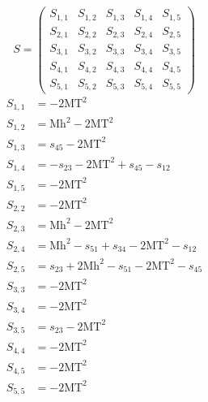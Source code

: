 \documentclass[a4paper]{article}
\begin{document}
\begin{equation}
S=\left(\begin{array}{ccccc}
   S_{1,1}&
   S_{1,2}&
   S_{1,3}&
   S_{1,4}&
   S_{1,5}\\
   S_{2,1}&
   S_{2,2}&
   S_{2,3}&
   S_{2,4}&
   S_{2,5}\\
   S_{3,1}&
   S_{3,2}&
   S_{3,3}&
   S_{3,4}&
   S_{3,5}\\
   S_{4,1}&
   S_{4,2}&
   S_{4,3}&
   S_{4,4}&
   S_{4,5}\\
   S_{5,1}&
   S_{5,2}&
   S_{5,3}&
   S_{5,4}&
   S_{5,5}\end{array}\right)
\end{equation}
\begin{subequations}
\begin{align}
   S_{1,1}&=-2\text{MT}^2\\
   S_{1,2}&=\text{Mh}^2-2\text{MT}^2\\
   S_{1,3}&=s_{45}-2\text{MT}^2\\
   S_{1,4}&=-s_{23}-2\text{MT}^2+s_{45}-s_{12}\\
   S_{1,5}&=-2\text{MT}^2\\
   S_{2,2}&=-2\text{MT}^2\\
   S_{2,3}&=\text{Mh}^2-2\text{MT}^2\\
   S_{2,4}&=\text{Mh}^2-s_{51}+s_{34}-2\text{MT}^2-s_{12}\\
   S_{2,5}&=s_{23}+2\text{Mh}^2-s_{51}-2\text{MT}^2-s_{45}\\
   S_{3,3}&=-2\text{MT}^2\\
   S_{3,4}&=-2\text{MT}^2\\
   S_{3,5}&=s_{23}-2\text{MT}^2\\
   S_{4,4}&=-2\text{MT}^2\\
   S_{4,5}&=-2\text{MT}^2\\
   S_{5,5}&=-2\text{MT}^2
\end{align}
\end{subequations}
\end{document}
